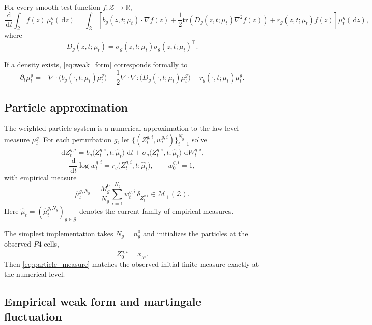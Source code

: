 \documentclass[11pt]{article}
\newcommand{\R}{\mathbb{R}}
\newcommand{\dd}{\,\mathrm{d}}
\newcommand{\tr}{\mathrm{tr}}
\newcommand{\Gcal}{\mathcal{G}}
\newcommand{\Zcal}{\mathcal{Z}}
\newcommand{\Mplus}{\mathcal{M}_{+}}
\begin{document}
For every smooth test function $f:\Zcal\to\R$,
\begin{equation}
\frac{\dd}{\dd t}\int_{\Zcal}f(z)\,\mu_t^g(\dd z)
=
\int_{\Zcal}
\left[
 b_g(z,t;\mu_t)\cdot \nabla f(z)
 +
 \frac{1}{2}\tr\!\left(D_g(z,t;\mu_t)\nabla^2 f(z)\right)
 +
 r_g(z,t;\mu_t)f(z)
\right]
\mu_t^g(\dd z),
\label{eq:weak_form}
\end{equation}
where
\[
D_g(z,t;\mu_t)=\sigma_g(z,t;\mu_t)\sigma_g(z,t;\mu_t)^\top.
\]

If a density exists, \cref{eq:weak_form} corresponds formally to
\begin{equation}
\partial_t \mu_t^g
=
-\nabla\cdot\!\big(b_g(\cdot,t;\mu_t)\mu_t^g\big)
+
\frac{1}{2}\nabla\cdot\nabla:\!\big(D_g(\cdot,t;\mu_t)\mu_t^g\big)
+
r_g(\cdot,t;\mu_t)\mu_t^g.
\label{eq:fokker_planck}
\end{equation}

\subsection{Particle approximation}

The weighted particle system is a numerical approximation to the law-level measure $\mu_t^g$. For each perturbation $g$, let $\{(Z_t^{g,i},w_t^{g,i})\}_{i=1}^{N_g}$ solve
\begin{equation}
\dd Z_t^{g,i}
=
b_g\big(Z_t^{g,i},t;\hat\mu_t\big)\,\dd t
+
\sigma_g\big(Z_t^{g,i},t;\hat\mu_t\big)\,\dd W_t^{g,i},
\label{eq:particle_sde}
\end{equation}
\begin{equation}
\frac{\dd}{\dd t}\log w_t^{g,i}
=
r_g\big(Z_t^{g,i},t;\hat\mu_t\big),
\qquad
w_0^{g,i}=1,
\label{eq:particle_weight}
\end{equation}
with empirical measure
\begin{equation}
\hat\mu_t^{g,N_g}
=
\frac{M_g^0}{N_g}
\sum_{i=1}^{N_g}
w_t^{g,i}\,\delta_{Z_t^{g,i}}
\in\Mplus(\Zcal).
\label{eq:particle_measure}
\end{equation}
Here $\hat\mu_t=(\hat\mu_t^{g,N_g})_{g\in\Gcal}$ denotes the current family of empirical measures.

The simplest implementation takes $N_g=n_g^0$ and initializes the particles at the observed $P4$ cells,
\[
Z_0^{g,i}=x_{gi}.
\]
Then \cref{eq:particle_measure} matches the observed initial finite measure exactly at the numerical level.

\subsection{Empirical weak form and martingale fluctuation}
\end{document}
